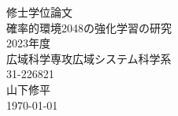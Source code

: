 \documentclass[11pt, dvipdfmx, openany]{jsbook}
\begin{document}
\begin{titlepage}
\begin{center}
    \vspace*{50truept}
    {\huge 修士学位論文}\\ %
    \vspace*{100truept}
    {\huge 確率的環境2048の強化学習の研究}\\ %
    \vspace{10truept}
    \vspace{120truept}
    {\huge 2023年度} \\
    \vspace{30truept}
    {\huge 広域科学専攻広域システム科学系} \\
    \vspace{30truept}
    {\huge 31-226821}\\ 
    \vspace{30truept}
    {\huge 山下修平}\\ 
    \vspace{50truept}
    {\huge \today}\\ %
\end{center}
\end{titlepage}

\tableofcontents
\clearpage











\appendix

\end{document}
